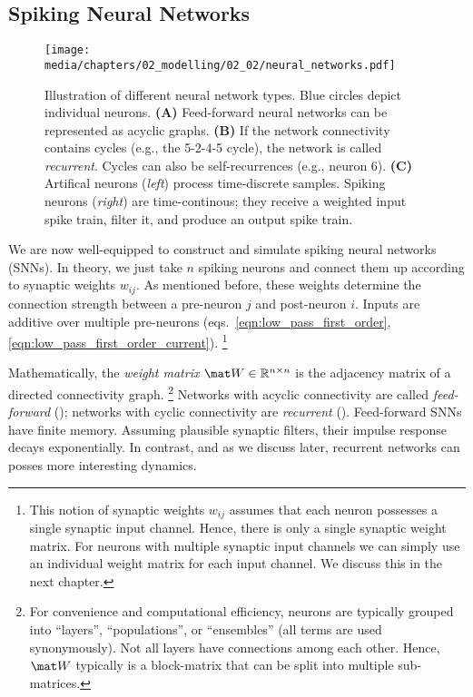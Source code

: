 \pagebreak

\subsection{Spiking Neural Networks}
\label{sec:neural_codes}

\begin{figure}
	\centering
	\texttt{[image: media/chapters/02\_modelling/02\_02/neural\_networks.pdf]}%
	{\label{fig:neural_networks_a}}%
	{\label{fig:neural_networks_b}}%
	{\label{fig:neural_networks_c}}%
	\caption[Illustration of different neural network types]{Illustration of different neural network types. Blue circles depict individual neurons. \textbf{(A)} Feed-forward neural networks can be represented as acyclic graphs. \textbf{(B)} If the network connectivity contains cycles (e.g., the 5-2-4-5 cycle), the network is called \emph{recurrent}. Cycles can also be self-recurrences (e.g., neuron 6). \textbf{(C)} Artifical neurons (\emph{left}) process time-discrete samples. Spiking neurons (\emph{right}) are time-continous; they receive a weighted input spike train, filter it, and produce an output spike train.}
\end{figure}


We are now well-equipped to construct and simulate spiking neural networks (SNNs).
In theory, we just take $n$ spiking neurons and connect them up according to synaptic weights $w_{ij}$. As mentioned before, these weights determine the connection strength between a pre-neuron $j$ and post-neuron $i$. Inputs are additive over multiple pre-neurons (eqs.~\ref{eqn:low_pass_first_order}, \ref{eqn:low_pass_first_order_current}).%
\footnote{This notion of synaptic weights $w_{ij}$ assumes that each neuron possesses a single synaptic input channel.
Hence, there is only a single synaptic weight matrix.
For neurons with multiple synaptic input channels we can simply use an individual weight matrix for each input channel. We discuss this in the next chapter.}

Mathematically, the \emph{weight matrix} $\mat W \in \mathbb{R}^{n \times n}$ is the adjacency matrix of a directed connectivity graph.%
\footnote{For convenience and computational efficiency, neurons are typically grouped into \enquote{layers}, \enquote{populations}, or \enquote{ensembles} (all terms are used synonymously).
Not all layers have connections among each other. Hence, $\mat W$ typically is a block-matrix that can be split into multiple sub-matrices.}
Networks with acyclic connectivity are called \emph{feed-forward} (); networks with cyclic connectivity are \emph{recurrent} ().
Feed-forward SNNs have finite memory.
Assuming plausible synaptic filters, their impulse response decays exponentially.
In contrast, and as we discuss later, recurrent networks can posses more interesting dynamics.

